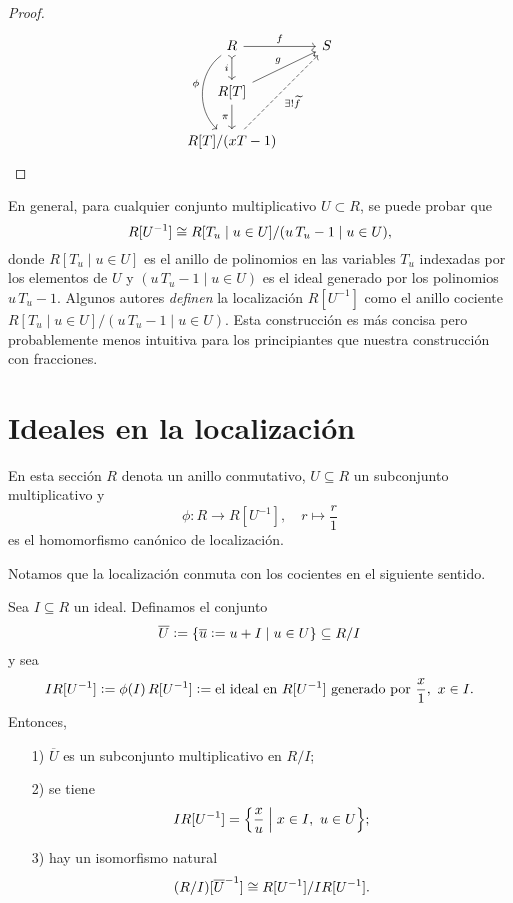 \begin{proposicion}
\begin{proof}
    \[ \begin{tikzcd}
        R\ar{r}{f}\ar[>->]{d}[swap]{i}\ar[bend right=50]{dd}[swap]{\phi} & S \\
        R [T] \ar{d}[swap]{\pi}\ar{ur}{g} \\
        R [T] / (xT - 1)\ar[dashed]{uur}[swap]{\exists ! \widetilde{f}}
      \end{tikzcd} \]
  \end{proof}
\end{proposicion}

En general, para cualquier conjunto multiplicativo $U \subset R$, se puede
probar que
$$R [U^{-1}] \cong R [T_u \mid u\in U] / (u\,T_u - 1 \mid u\in U),$$
donde $R [T_u \mid u\in U]$ es el anillo de polinomios en las variables $T_u$
indexadas por los elementos de $U$ y $(u\,T_u - 1 \mid u\in U)$ es el ideal
generado por los polinomios $u\,T_u - 1$. Algunos autores \emph{definen}
la localización $R [U^{-1}]$ como el anillo cociente
$R [T_u \mid u\in U] / (u\,T_u - 1 \mid u\in U)$. Esta construcción es más
concisa pero probablemente menos intuitiva para los principiantes que nuestra
construcción con fracciones.


\section{Ideales en la localización}
\label{sec:ideales-en-localizacion}

En esta sección $R$ denota un anillo conmutativo, $U \subseteq R$ un subconjunto
multiplicativo y
$$\phi\colon R\to R [U^{-1}], \quad r \mapsto \frac{r}{1}$$
es el homomorfismo canónico de localización.

Notamos que la localización conmuta con los cocientes en el siguiente sentido.

\begin{proposicion}
  \label{prop:localizacion-y-cocientes}
  Sea $I \subseteq R$ un ideal. Definamos el conjunto
  $$\overline{U} \mathrel{\mathop:}= \{ \overline{u} \mathrel{\mathop:}= u + I \mid u\in U \} \subseteq R/I$$
  y sea
  \[ I R [U^{-1}] \mathrel{\mathop:}= \phi (I)\,R [U^{-1}] \mathrel{\mathop:}=
     \text{el ideal en }R [U^{-1}]\text{ generado por }\frac{x}{1}, ~ x \in I. \]
  Entonces,

  \begin{enumerate}
  \item[1)] $\overline{U}$ es un subconjunto multiplicativo en $R/I$;

  \item[2)] se tiene
    $$I R [U^{-1}] = \Bigl\{ \frac{x}{u} \Bigm| x\in I, ~ u\in U \Bigr\};$$

  \item[3)] hay un isomorfismo natural
    $$(R/I) [\overline{U}^{-1}] \cong R [U^{-1}] / I R [U^{-1}].$$
  \end{enumerate}
\end{proposicion}

